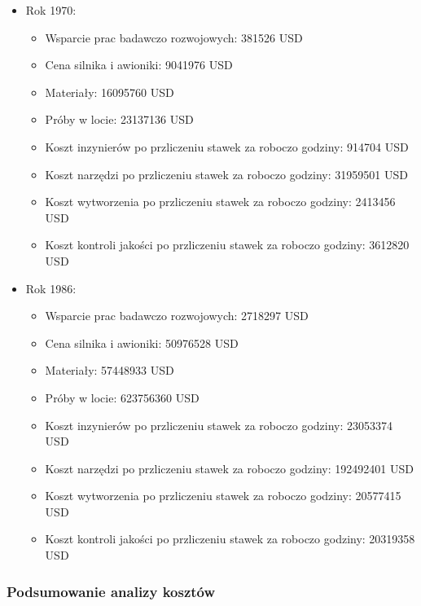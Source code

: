         \begin{itemize}
            \item Rok 1970:
                \begin{itemize}
                    \item Wsparcie prac badawczo rozwojowych: 381526 USD
                    \item Cena silnika i awioniki: 9041976 USD
                    \item Materiały: 16095760 USD
                    \item Próby w locie: 23137136 USD
                    \item Koszt inzynierów po przliczeniu stawek za roboczo godziny: 914704 USD
                    \item Koszt narzędzi po przliczeniu stawek za roboczo godziny: 31959501 USD
                    \item Koszt wytworzenia po przliczeniu stawek za roboczo godziny: 2413456 USD
                    \item Koszt kontroli jakości po przliczeniu stawek za roboczo godziny: 3612820 USD
                \end{itemize}
            \item Rok 1986:
                \begin{itemize}
                    \item Wsparcie prac badawczo rozwojowych: 2718297 USD
                    \item Cena silnika i awioniki: 50976528 USD
                    \item Materiały: 57448933 USD
                    \item Próby w locie: 623756360 USD
                    \item Koszt inzynierów po przliczeniu stawek za roboczo godziny: 23053374 USD
                    \item Koszt narzędzi po przliczeniu stawek za roboczo godziny: 192492401 USD
                    \item Koszt wytworzenia po przliczeniu stawek za roboczo godziny: 20577415 USD
                    \item Koszt kontroli jakości po przliczeniu stawek za roboczo godziny: 20319358 USD
                \end{itemize}
        \end{itemize}

        \subsubsection{Podsumowanie analizy kosztów}

